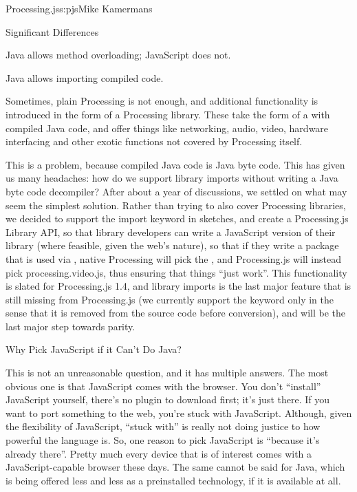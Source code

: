 \begin{aosachapter}{Processing.js}{s:pjs}{Mike Kamermans}
\begin{aosasect1}{Significant Differences}
\begin{aosasect3}{Java allows method overloading; JavaScript does not.}
\end{aosasect3}

\begin{aosasect3}{Java allows importing compiled code.}

Sometimes, plain Processing is not enough, and additional
functionality is introduced in the form of a Processing library. These
take the form of a  with compiled Java code, and offer
things like networking, audio, video, hardware interfacing and other
exotic functions not covered by Processing itself.

This is a problem, because compiled Java code is Java byte code. This
has given us many headaches: how do we support library imports without
writing a Java byte code decompiler? After about a year of
discussions, we settled on what may seem the simplest solution. Rather
than trying to also cover Processing libraries, we decided to support
the import keyword in sketches, and create a Processing.js Library
API, so that library developers can write a JavaScript version of
their library (where feasible, given the web's nature), so that if
they write a package that is used via ,
native Processing will pick the , and Processing.js
will instead pick processing.video.js, thus ensuring that things
``just work''. This functionality is slated for Processing.js 1.4, and
library imports is the last major feature that is still missing from
Processing.js (we currently support the  keyword only in the
sense that it is removed from the source code before conversion), and
will be the last major step towards parity.

\end{aosasect3}

\begin{aosasect2}{Why Pick JavaScript if it Can't Do Java?}

This is not an unreasonable question, and it has multiple answers. The
most obvious one is that JavaScript comes with the browser. You don't
``install'' JavaScript yourself, there's no plugin to download first;
it's just there. If you want to port something to the web, you're
stuck with JavaScript. Although, given the flexibility of JavaScript,
``stuck with'' is really not doing justice to how powerful the language
is. So, one reason to pick JavaScript is ``because it's already
there''. Pretty much every device that is of interest comes with a
JavaScript-capable browser these days. The same cannot be said for
Java, which is being offered less and less as a preinstalled
technology, if it is available at all.


\end{aosasect2}
\end{aosasect1}
\end{aosachapter}
